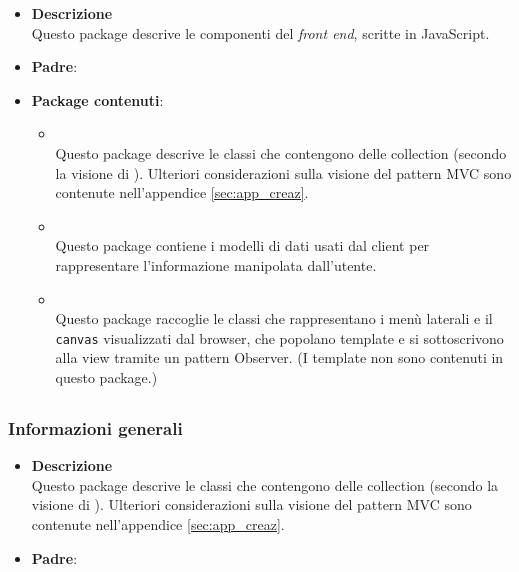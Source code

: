\begin{itemize}
\item \textbf{Descrizione}\\
Questo package descrive le componenti del \emph{front end}, scritte in JavaScript.
\item \textbf{Padre}: \hyperref[\nogloxy{swedesigner}]{}
\item \textbf{Package contenuti}:
\begin{itemize}
\item \hyperref[\nogloxy{swedesigner::client::collection}]{}\\
Questo package descrive le classi che contengono delle collection (secondo la visione di \backbonejs). Ulteriori considerazioni sulla visione del pattern MVC sono contenute nell'appendice \ref{sec:app_creaz}.
\item \hyperref[\nogloxy{swedesigner::client::model}]{}\\
Questo package contiene i modelli di dati usati dal client per rappresentare l'informazione manipolata dall'utente.
\item \hyperref[\nogloxy{swedesigner::client::view}]{}\\
Questo package raccoglie le classi che rappresentano i menù laterali e il \texttt{canvas} visualizzati dal browser, che popolano template e si sottoscrivono alla view tramite un pattern Observer. (I template non sono contenuti in questo package.)
\end{itemize}
\end{itemize}

\subsection{}
\label{\nogloxy{swedesigner::client::collection}}
\subsubsection{Informazioni generali}
\begin{itemize}
\item \textbf{Descrizione}\\
Questo package descrive le classi che contengono delle collection (secondo la visione di \backbonejs). Ulteriori considerazioni sulla visione del pattern MVC sono contenute nell'appendice \ref{sec:app_creaz}.
\item \textbf{Padre}: \hyperref[\nogloxy{swedesigner::client}]{}
\end{itemize}

